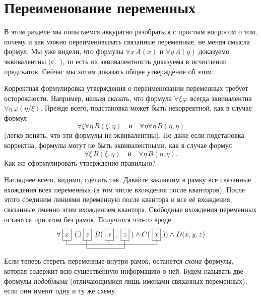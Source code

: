 \section{Переименование переменных}
        \label{renaming-variables}
В этом разделе мы попытаемся аккуратно разобраться с простым
вопросом о том, почему и как можно переименовывать связанные
переменные, не меняя смысла формул. Мы уже видели, что формулы
$\forall x\,A(x)$ и $\forall y\,A(y)$ доказуемо эквивалентны
(с.~\pageref{changing-variables-example}), то есть их
эквивалентность доказуема в исчислении предикатов. Сейчас мы
хотим доказать общее утверждение об этом.

Корректная формулировка утверждения о переименовании переменных
требует осторожности. Например, нельзя сказать, что формула
$\forall\xi\, \varphi$ всегда эквивалентна
$\forall\eta\,\varphi(\eta/\xi)$. Прежде всего, подстановка может
быть некорректной, как в случае формул
        $$
\forall \xi \forall\eta\,  B(\xi,\eta) \quad\text{и}\quad
\forall \eta \forall\eta\,  B(\eta,\eta)
        $$
(легко понять, что эти формулы не эквивалентны).
Но даже если подстановка корректна, формулы могут не быть
эквивалентными, как в случае формул
        $$
\forall \xi\, B(\xi,\eta) \quad\text{и}\quad
\forall \eta\, B(\eta,\eta).
        $$
Как же сформулировать утверждение правильно?

Нагляднее всего, видимо, сделать так. Давайте заключим в рамку
все связанные вхождения всех переменных (в том числе вхождения
после кванторов). После этого соединим линиями переменную после
квантора и все её вхождения, связанные именно этим вхождением
квантора. Свободные вхождения переменных остаются при этом без
рамок. Получится что-то вроде
$$
\unitlength=1mm
\begin{picture}(90,10)
\put(8,6){$\forall \framevar{x}\,(\exists\framevar{z}\,
        B(\framevar{x},\framevar{z}) \land C(\framevar{x}))
        \land D(x,y,z).$}

\put(13,2){\line(0,1){2}}
\put(34.1,2){\line(0,1){2}}
\put(58,2){\line(0,1){2}}
\put(13,2){\line(1,0){45}}
\put(23,0){\line(0,1){4}}
\put(42,0){\line(0,1){4}}
\put(23,0){\line(1,0){19}}
\end{picture}
$$
Если теперь стереть переменные внутри рамок, останется
\emph{схема}%
%
формулы, которая содержит всю существенную
информацию о ней. Будем называть две формулы \emph{подобными}%
%
(отличающимися лишь именами связанных переменных), если они
имеют одну и ту же схему.

